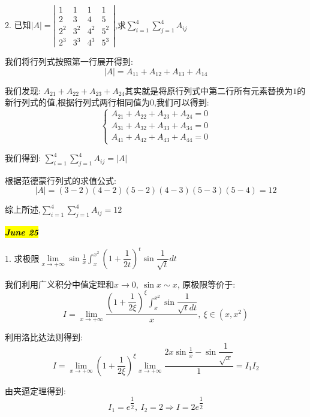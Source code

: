 
2. 已知$|A|=\left|
\begin{matrix}
	1&1&1&1\\
	2&3&4&5\\
	2^2&3^2&4^2&5^2\\
	2^3&3^3&4^3&5^3
\end{matrix}
\right|$,求$\sum\limits_{i=1}^{4}\sum\limits_{j=1}^{4}A_{ij}$
\begin{solution}
	
	我们将行列式按照第一行展开得到: 
	$$|A|=A_{11}+A_{12}+A_{13}+A_{14}$$
	
	我们发现: $A_{21}+A_{22}+A_{23}+A_{24}$其实就是将原行列式中第二行所有元素替换为$1$的新行列式的值,根据行列式两行相同值为$0$,我们可以得到: 
	$$\left\lbrace
	\begin{array}{l}
		A_{21}+A_{22}+A_{23}+A_{24}=0\\
		A_{31}+A_{32}+A_{33}+A_{34}=0\\
		A_{41}+A_{42}+A_{43}+A_{44}=0
	\end{array}
	\right. $$
	
	我们得到: $\sum\limits_{i=1}^{4}\sum\limits_{j=1}^{4}A_{ij}=|A|$
	
	根据范德蒙行列式的求值公式: 
	$$|A|=(3-2)(4-2)(5-2)(4-3)(5-3)(5-4)=12$$
	
	综上所述,$\sum\limits_{i=1}^{4}\sum\limits_{j=1}^{4}A_{ij}=12$
\end{solution}

\hl{\textbf{\textit{June 25}}}

1. 求极限$\lim\limits_{x\rightarrow +\infty}\sin\frac{1}{x}\int_{x}^{x^2}(1+\dfrac{1}{2t})^{t}\sin\dfrac{1}{\sqrt{t}}dt$
\begin{solution}
	
	我们利用广义积分中值定理和$x\rightarrow 0,\ \sin x\sim x$, 原极限等价于: 
	$$I=\lim\limits_{x\rightarrow +\infty}\dfrac{(1+\dfrac{1}{2\xi})^{\xi}\int_{x}^{x^2}\sin\dfrac{1}{\sqrt{t}dt}}{x},\ \xi\in(x,x^2)$$
	
	利用洛比达法则得到: 
	$$I=\lim\limits_{x\rightarrow +\infty}(1+\dfrac{1}{2\xi})^{\xi} \lim\limits_{x\rightarrow +\infty}\dfrac{2x\sin\frac{1}{x}-\sin\dfrac{1}{\sqrt{x}}}{1}=I_{1}I_{2}$$
	
	由夹逼定理得到: 
	$$I_{1}=e^{\dfrac{1}{2}},\  I_{2}=2\Rightarrow I=2e^{\dfrac{1}{2}}$$
\end{solution}

